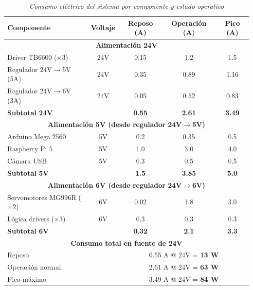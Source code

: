 \begin{table}[H]
\centering
\small
\begin{tabular}{|l|c|c|c|c|}
\hline
\textbf{Componente} & \textbf{Voltaje} & \textbf{Reposo (A)} & \textbf{Operación (A)} & \textbf{Pico (A)} \\
\hline
\multicolumn{5}{|c|}{\textbf{Alimentación 24V}} \\
\hline
Driver TB6600 ($\times$3) & 24V & 0.15 & 1.2 & 1.5 \\
\hline
Regulador 24V$\rightarrow$5V (5A)& 24V & 0.35 & 0.89 & 1.16 \\
\hline
Regulador 24V$\rightarrow$6V (3A)& 24V & 0.05 & 0.52 & 0.83 \\
\hline
\multicolumn{2}{|l|}{\textbf{Subtotal 24V}} & \textbf{0.55} & \textbf{2.61} & \textbf{3.49} \\
\hline
\hline
\multicolumn{5}{|c|}{\textbf{Alimentación 5V (desde regulador 24V$\rightarrow$5V)}} \\
\hline
Arduino Mega 2560 & 5V & 0.2 & 0.35 & 0.5 \\
\hline
Raspberry Pi 5 & 5V & 1.0 & 3.0 & 4.0 \\
\hline
Cámara USB & 5V & 0.3 & 0.5 & 0.5 \\
\hline
\multicolumn{2}{|l|}{\textbf{Subtotal 5V}} & \textbf{1.5} & \textbf{3.85} & \textbf{5.0} \\
\hline
\hline
\multicolumn{5}{|c|}{\textbf{Alimentación 6V (desde regulador 24V$\rightarrow$6V)}} \\
\hline
Servomotores MG996R ($\times$2) & 6V & 0.02 & 1.8 & 3.0 \\
\hline
Lógica drivers ($\times$3) & 6V & 0.3 & 0.3 & 0.3 \\
\hline
\multicolumn{2}{|l|}{\textbf{Subtotal 6V}} & \textbf{0.32} & \textbf{2.1} & \textbf{3.3} \\
\hline
\hline
\multicolumn{5}{|c|}{\textbf{Consumo total en fuente de 24V}} \\
\hline
\multicolumn{2}{|l|}{Reposo} & \multicolumn{3}{c|}{0.55 A @ 24V = \textbf{13 W}} \\
\hline
\multicolumn{2}{|l|}{Operación normal} & \multicolumn{3}{c|}{2.61 A @ 24V = \textbf{63 W}} \\
\hline
\multicolumn{2}{|l|}{Pico máximo} & \multicolumn{3}{c|}{3.49 A @ 24V = \textbf{84 W}} \\
\hline
\end{tabular}
\caption{\textit{Consumo eléctrico del sistema por componente y estado operativo}}
\label{tab:consumo_energetico_prototipo}
\end{table}

